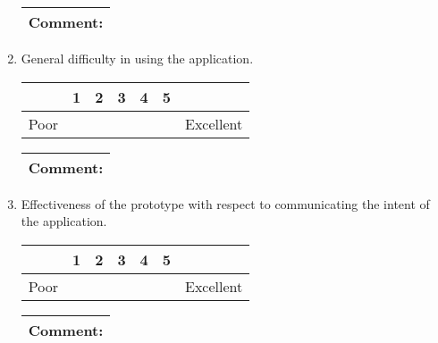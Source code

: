 \documentclass[a4paper, parskip=half]{scrartcl}
\begin{document}
\begin{enumerate}
{    \begin{tabularx}{\textwidth}{|X|}
      \hline
      \textbf{Comment:}\\[2cm]
      \hline
    \end{tabularx}
  }

  \item{
    General difficulty in using the application.

    \begin{tabularx}{\textwidth}{|X|C|C|C|C|C|X|}
       & 1 & 2 & 3 & 4 & 5 &  \\
      \hline
      Poor & & & & & & Excellent\\
      \hline
    \end{tabularx}

    \begin{tabularx}{\textwidth}{|X|}
      \hline
      \textbf{Comment:}\\[2cm]
      \hline
    \end{tabularx}
  }

  \item{
    Effectiveness of the prototype with respect to communicating the intent of the application.

    \begin{tabularx}{\textwidth}{|X|C|C|C|C|C|X|}
       & 1 & 2 & 3 & 4 & 5 &  \\
      \hline
      Poor & & & & & & Excellent\\
      \hline
    \end{tabularx}

    \begin{tabularx}{\textwidth}{|X|}
      \hline
      \textbf{Comment:}\\[2cm]
      \hline
    \end{tabularx}
  }
\end{enumerate}
\end{document}
